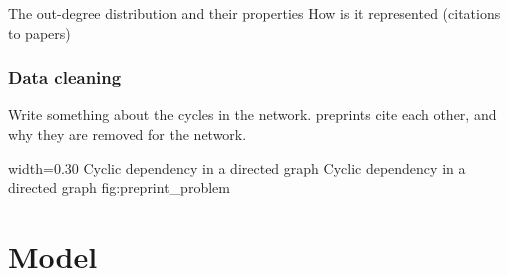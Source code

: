 \begin{figure}
  \begin{floatrow}

  \end{floatrow}
\end{figure}

The out-degree distribution and their properties How is it represented (citations to papers)

\subsubsection{Data cleaning}
\label{subsubsec:data_cleaning}
Write something about the cycles in the network. preprints cite each other, and why they are removed for the network.

      {width=0.30\textwidth}
      {Cyclic dependency in a directed graph}
      {Cyclic dependency in a directed graph}
      {fig:preprint_problem}

\section{Model}
\label{sec:model}

